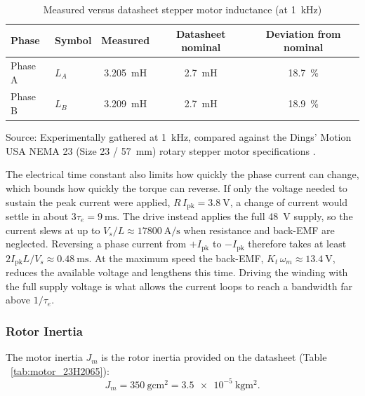  \begin{table}[htbp]
 	\centering
 	\caption{Measured versus datasheet stepper motor inductance (at \SI{1}{\kilo\hertz})}
 	\label{tab:measured_inductance}
 	\begin{tabular}{@{}llccc@{}}
 		\toprule
 		Phase & Symbol & Measured & Datasheet nominal & Deviation from nominal \\
 		\midrule
 		Phase A & $L_{A}$ & \SI{3.205}{\milli\henry} & \SI{2.7}{\milli\henry} & \SI[retain-explicit-plus]{+18.7}{\percent} \\
 		Phase B & $L_{B}$ & \SI{3.209}{\milli\henry} & \SI{2.7}{\milli\henry} & \SI[retain-explicit-plus]{+18.9}{\percent} \\
 		\bottomrule
 	\end{tabular}
 	\vspace{0.5ex}
 	
 	\footnotesize Source: Experimentally gathered at \SI{1}{\kilo\hertz}, compared against the Dings' Motion USA NEMA 23 (Size 23 / \SI{57}{\milli\metre}) rotary stepper motor specifications \cite{dings_nema23_2026}.
 \end{table}
 
 
The electrical time constant also limits how quickly the phase current can change, which bounds how quickly the torque can reverse. If only the voltage needed to sustain the peak current were applied, $R\, I_{\mathrm{pk}} = \SI{3.8}{\volt}$, a change of current would settle in about $3\tau_e = \SI{9}{\milli\second}$. The drive instead applies the full \SI{48}{\volt} supply, so the current slews at up to $V_s/L \approx \SI{17800}{\ampere\per\second}$ when resistance and back-EMF are neglected. Reversing a phase current from $+I_{\mathrm{pk}}$ to $-I_{\mathrm{pk}}$ therefore takes at least $2 I_{\mathrm{pk}} L / V_s \approx \SI{0.48}{\milli\second}$. At the maximum speed the back-EMF, $K_t\, \omega_m \approx \SI{13.4}{\volt}$, reduces the available voltage and lengthens this time. Driving the winding with the full supply voltage is what allows the current loops to reach a bandwidth far above $1/\tau_e$.

\subsubsection{Rotor Inertia}

The motor inertia $J_m$ is the rotor inertia provided on the datasheet (Table ~\ref{tab:motor_23H2065}):
\begin{equation}
	J_m = \SI{350}{\gram\centi\meter\squared}
	= \SI{3.5e-5}{\kilo\gram\meter\squared}.
	\label{eq:Jm}
\end{equation}

